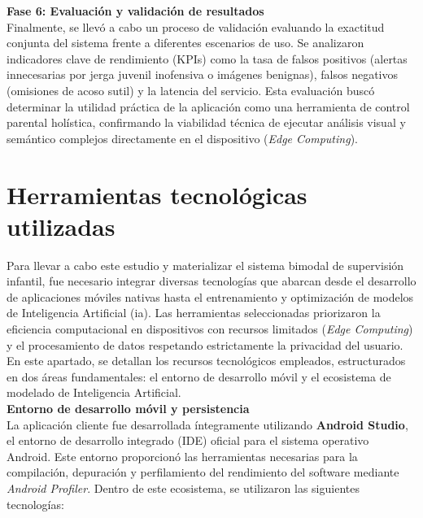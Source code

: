 \textbf{Fase 6: Evaluación y validación de resultados} \\
Finalmente, se llevó a cabo un proceso de validación evaluando la exactitud conjunta del sistema frente a diferentes escenarios de uso. Se analizaron indicadores clave de rendimiento (KPIs) como la tasa de falsos positivos (alertas innecesarias por jerga juvenil inofensiva o imágenes benignas), falsos negativos (omisiones de acoso sutil) y la latencia del servicio. Esta evaluación buscó determinar la utilidad práctica de la aplicación como una herramienta de control parental holística, confirmando la viabilidad técnica de ejecutar análisis visual y semántico complejos directamente en el dispositivo (\textit{Edge Computing}).

\section{Herramientas tecnológicas utilizadas}
Para llevar a cabo este estudio y materializar el sistema bimodal de supervisión infantil, fue necesario integrar diversas tecnologías que abarcan desde el desarrollo de aplicaciones móviles nativas hasta el entrenamiento y optimización de modelos de Inteligencia Artificial (\gls{ia}). Las herramientas seleccionadas priorizaron la eficiencia computacional en dispositivos con recursos limitados (\textit{Edge Computing}) y el procesamiento de datos respetando estrictamente la privacidad del usuario. En este apartado, se detallan los recursos tecnológicos empleados, estructurados en dos áreas fundamentales: el entorno de desarrollo móvil y el ecosistema de modelado de Inteligencia Artificial. \\

\textbf{Entorno de desarrollo móvil y persistencia}\\
La aplicación cliente fue desarrollada íntegramente utilizando \textbf{Android Studio}, el entorno de desarrollo integrado (IDE) oficial para el sistema operativo Android. Este entorno proporcionó las herramientas necesarias para la compilación, depuración y perfilamiento del rendimiento del software mediante \textit{Android Profiler}. Dentro de este ecosistema, se utilizaron las siguientes tecnologías:

